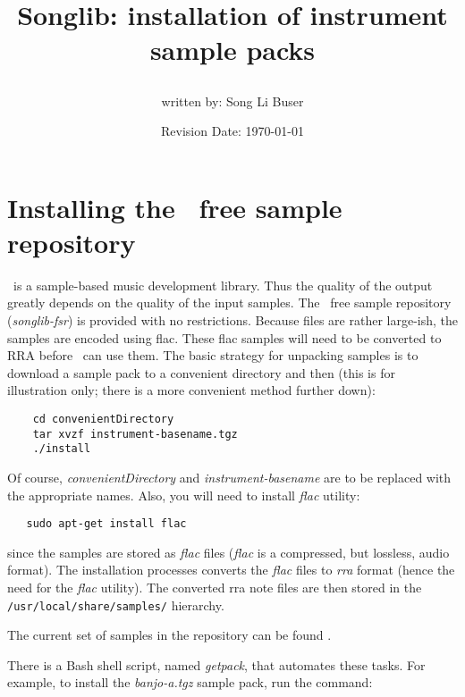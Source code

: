 \documentclass{article}
\title{Songlib: installation of instrument sample packs\\
\date{Revision Date: \today}}
\author{written by: Song Li Buser}
\begin{document}
\maketitle

\W\subsubsection*{}
\W\htmlrule

\section*{Installing the \songlib\ free sample repository}

\Songlib\ is a sample-based music development library. Thus
the quality of the output greatly depends on the quality
of the input samples. The \songlib\ free sample repository
({\it songlib-fsr}) is provided with no restrictions. Because
 files are rather large-ish, the samples
are encoded using flac. These flac samples will need to
be converted to {\sc RRA} before \songlib\ can use them. The
basic strategy for unpacking samples is to download
a sample pack to a convenient directory and then (this
is for illustration only; there is a more convenient
method further down):

\begin{verbatim}
    cd convenientDirectory
    tar xvzf instrument-basename.tgz
    ./install
\end{verbatim}

Of course, {\it convenientDirectory} and {\it instrument-basename} are
to be replaced with the appropriate names. Also, you will need to
install {\it flac} utility:

\begin{verbatim}
   sudo apt-get install flac
\end{verbatim}

since the samples are stored as {\it flac} files ({\it flac} is a compressed,
but lossless, audio format). The installation processes converts
the {\it flac} files to {\it rra} format
(hence the need for the {\it flac} utility).
The converted rra note files are then
stored in the {\tt /usr/local/share/samples/}
hierarchy.

The current set of samples in the repository can be found
.

There is a Bash shell script, named {\it getpack}, that automates
these tasks. For example, to install the {\it banjo-a.tgz} sample pack,
run the command:
\end{document}
